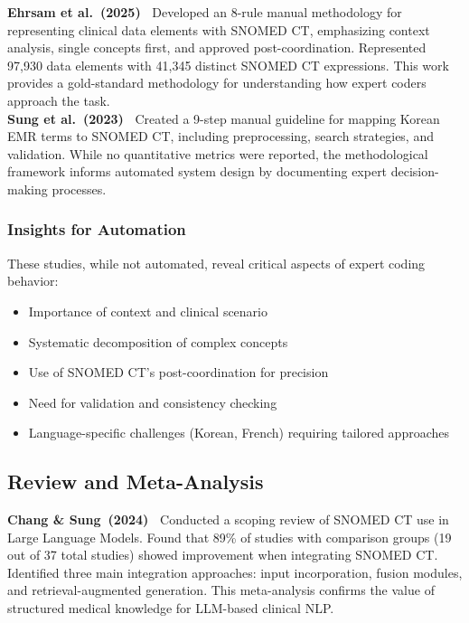 \textbf{Ehrsam et al.~(2025)~\cite{Ehrsam:2025}} Developed an 8-rule manual methodology for representing clinical data elements with SNOMED CT, emphasizing context analysis, single concepts first, and approved post-coordination. Represented 97,930 data elements with 41,345 distinct SNOMED CT expressions. This work provides a gold-standard methodology for understanding how expert coders approach the task.\\

\textbf{Sung et al.~(2023)~\cite{Sung:2023}} Created a 9-step manual guideline for mapping Korean EMR terms to SNOMED CT, including preprocessing, search strategies, and validation. While no quantitative metrics were reported, the methodological framework informs automated system design by documenting expert decision-making processes.\\

\subsubsection{Insights for Automation}

These studies, while not automated, reveal critical aspects of expert coding behavior:
\begin{itemize}
    \item Importance of context and clinical scenario
    \item Systematic decomposition of complex concepts
    \item Use of SNOMED CT's post-coordination for precision
    \item Need for validation and consistency checking
    \item Language-specific challenges (Korean, French) requiring tailored approaches
\end{itemize}

\subsection{Review and Meta-Analysis}

\textbf{Chang \& Sung~(2024)~\cite{Chang:2024}} Conducted a scoping review of SNOMED CT use in Large Language Models. Found that 89\% of studies with comparison groups (19 out of 37 total studies) showed improvement when integrating SNOMED CT. Identified three main integration approaches: input incorporation, fusion modules, and retrieval-augmented generation. This meta-analysis confirms the value of structured medical knowledge for LLM-based clinical NLP.

